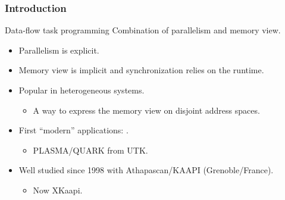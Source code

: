 \begin{frame}
  \frametitle{Introduction}
  \begin{exampleblock}{Data-flow task programming}
    Combination of \alert<2->{parallelism} and \alert<2->{memory} view.
    \begin{itemize}
    \item Parallelism is explicit.
    \item Memory view is implicit and \alert<2->{synchronization relies on the runtime}.
    \end{itemize}
  \end{exampleblock}
  \begin{itemize}
  \item Popular in heterogeneous systems.
    \begin{itemize}
    \item A way to express the memory view on disjoint address spaces.
    \end{itemize}
  \item First ``modern'' applications: .
    \begin{itemize}
    \item PLASMA/QUARK from UTK.
    \end{itemize}
  \item Well studied since 1998 with Athapascan/KAAPI (Grenoble/France).
    \begin{itemize}
    \item Now XKaapi.
    \end{itemize}
  \end{itemize}
\end{frame}
